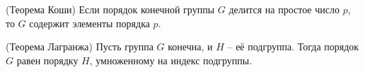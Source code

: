 \documentclass[_00_dissertation.tex]{subfiles}
\begin{document}
\begin{statement}\label{statement:cauchy}(Теорема Коши)
    Если порядок конечной группы $G$ делится на простое число $p$, то $G$ содержит элементы порядка $p$.
\end{statement}

\begin{statement}\label{statement:lagrange}(Теорема Лагранжа)
    Пусть группа $G$ конечна, и $H$ -- её подгруппа.
    Тогда порядок $G$ равен порядку $H$, умноженному на индекс подгруппы.
\end{statement}

\onlyinsubfile{
    
    
}
\end{document}
